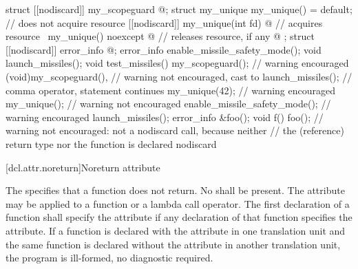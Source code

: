 \pnum
\begin{example}
\begin{codeblock}
struct [[nodiscard]] my_scopeguard { @\commentellip@ };
struct my_unique {
  my_unique() = default;                                // does not acquire resource
  [[nodiscard]] my_unique(int fd) { @\commentellip@ }         // acquires resource
  ~my_unique() noexcept { @\commentellip@ }                   // releases resource, if any
  @\commentellip@
};
struct [[nodiscard]] error_info { @\commentellip@ };
error_info enable_missile_safety_mode();
void launch_missiles();
void test_missiles() {
  my_scopeguard();              // warning encouraged
  (void)my_scopeguard(),        // warning not encouraged, cast to 
    launch_missiles();          // comma operator, statement continues
  my_unique(42);                // warning encouraged
  my_unique();                  // warning not encouraged
  enable_missile_safety_mode(); // warning encouraged
  launch_missiles();
}
error_info &foo();
void f() { foo(); }             // warning not encouraged: not a nodiscard call, because neither
                                // the (reference) return type nor the function is declared nodiscard
\end{codeblock}
\end{example}

[dcl.attr.noreturn]{Noreturn attribute}%

\pnum
The   specifies that a function does not return.
No  shall be present.
The attribute may be applied to a function or a lambda call operator.
The first declaration of a function shall
specify the  attribute if any declaration of that function specifies the
 attribute. If a function is declared with the  attribute in one
translation unit and the same function is declared without the  attribute in another
translation unit, the program is ill-formed, no diagnostic required.


